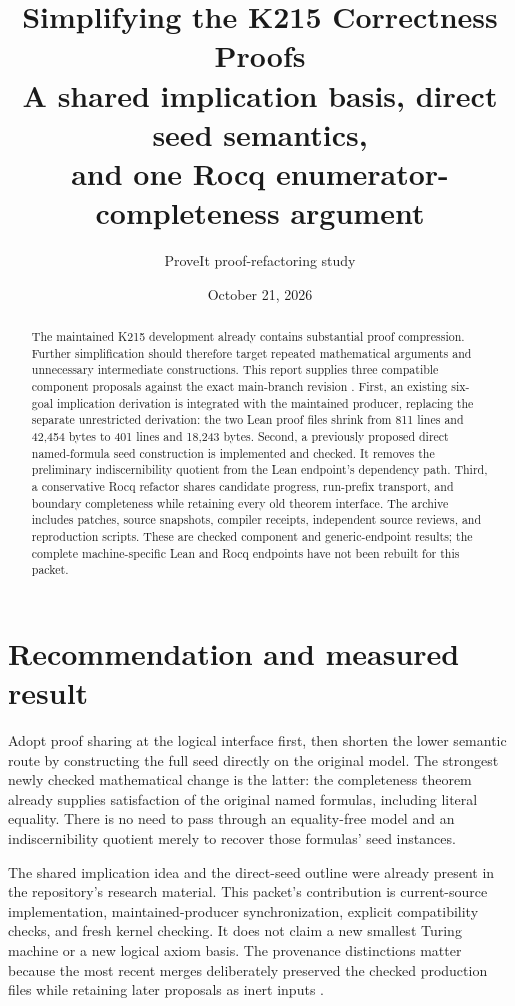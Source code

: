 \documentclass[11pt,letterpaper]{article}
\title{Simplifying the K215 Correctness Proofs\\[0.35em]
  \large A shared implication basis, direct seed semantics,\\
  and one Rocq enumerator-completeness argument}
\author{ProveIt proof-refactoring study}
\date{October 21, 2026}
\newcommand{\code}[1]{\texttt{\detokenize{#1}}}
\begin{document}
\maketitle
\begin{abstract}
The maintained K215 development already contains substantial proof compression.
Further simplification should therefore target repeated mathematical arguments and
unnecessary intermediate constructions. This report supplies three compatible
component proposals against the exact main-branch revision
\code{57541fe0cfe3af62b4cb58747d8d1d7c16b338d5}.
First, an existing six-goal implication derivation is integrated with the maintained
producer, replacing the separate unrestricted derivation: the two Lean proof files
shrink from 811 lines and 42,454 bytes to 401 lines and 18,243 bytes.
Second, a previously proposed direct named-formula seed construction is implemented
and checked. It removes the preliminary indiscernibility quotient from the Lean
endpoint's dependency path. Third, a conservative Rocq refactor shares candidate
progress, run-prefix transport, and boundary completeness while retaining every old
theorem interface. The archive includes patches, source snapshots, compiler receipts,
independent source reviews, and reproduction scripts. These are checked component
and generic-endpoint results; the complete machine-specific Lean and Rocq endpoints
have not been rebuilt for this packet.
\end{abstract}

\section{Recommendation and measured result}

Adopt proof sharing at the logical interface first, then shorten the lower semantic
route by constructing the full seed directly on the original model. The strongest
newly checked mathematical change is the latter: the completeness theorem already
supplies satisfaction of the original named formulas, including literal equality.
There is no need to pass through an equality-free model and an indiscernibility
quotient merely to recover those formulas' seed instances.

The shared implication idea and the direct-seed outline were already present in
the repository's research material. This packet's contribution is current-source
implementation, maintained-producer synchronization, explicit compatibility checks,
and fresh kernel checking. It does not claim a new smallest Turing machine or a new
logical axiom basis. The provenance distinctions matter because the most recent
merges deliberately preserved the checked production files while retaining later
proposals as inert inputs \cite{checkpoint,merge,seedproposal}.
\end{document}
